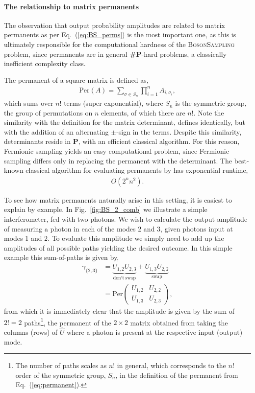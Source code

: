 \paragraph{The relationship to matrix permanents}

The observation that output probability amplitudes are related to matrix permanents as per Eq.~(\ref{eq:BS_perms}) is the most important one, as this is ultimately responsible for the computational hardness of the \textsc{BosonSampling} problem, since permanents are in general \textbf{\#P}-hard problems, a classically inefficient complexity class.

The permanent of a square matrix is defined as,
\begin{align}\label{eq:permanent}
\mathrm{Per}(A) = \sum_{\sigma\in S_n} \prod_{i=1}^n A_{i,\sigma_i},
\end{align}
which sums over $n!$ terms (super-exponential), where $S_n$ is the symmetric group, the group of permutations on $n$ elements, of which there are $n!$. Note the similarity with the definition for the matrix determinant, defines identically, but with the addition of an alternating $\pm$-sign in the terms. Despite this similarity, determinants reside in \textbf{P}, with an efficient classical algorithm. For this reason, Fermionic sampling yields an easy computational problem, since Fermionic sampling differs only in replacing the permanent with the determinant. The best-known classical algorithm for evaluating permanents by \cite{bib:RyserAlg} has exponential runtime,
\begin{align}
	O(2^n n^2).
\end{align}

To see how matrix permanents naturally arise in this setting, it is easiest to explain by example. In Fig.~\ref{fig:BS_2_comb} we illustrate a simple interferometer, fed with two photons. We wish to calculate the output amplitude of measuring a photon in each of the modes 2 and 3, given photons input at modes 1 and 2. To evaluate this amplitude we simply need to add up the amplitudes of all possible paths yielding the desired outcome. In this simple example this sum-of-paths is given by,
\begin{align} \label{eq:BS_2_ph_comb}
\gamma_{\{2,3\}} &= \underbrace{U_{1,2}U_{2,3}}_{\mathrm{don't\ swap}} + \underbrace{U_{1,3}U_{2,2}}_{\mathrm{swap}} \nonumber \\
&= \mathrm{Per}\begin{pmatrix}
   U_{1,2} & U_{2,2} \\
   U_{1,3} & U_{2,3}
  \end{pmatrix},
\end{align}
from which it is immediately clear that the amplitude is given by the sum of \mbox{$2!=2$} paths\footnote{The number of paths scales as $n!$ in general, which corresponds to the $n!$ order of the symmetric group, $S_n$, in the definition of the permanent from Eq.~(\ref{eq:permanent}).}, the permanent of the \mbox{$2\times 2$} matrix obtained from taking the columns (rows) of $\hat{U}$ where a photon is present at the respective input (output) mode.

